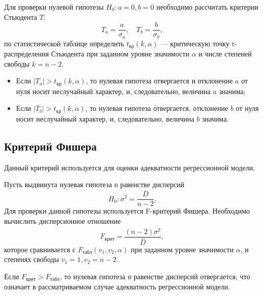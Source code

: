 Для проверки нулевой гипотезы $H_0: a=0, b=0$ необходимо рассчитать критерии Стьюдента $T$:
\begin{equation*}
	T_a = \frac{a}{\sigma_a}, \quad T_b = \frac{b}{\sigma_b},
\end{equation*}
по статистической таблице определить $t_{\textrm{кр}} \left( k, \alpha \right)$ --- критическую точку t-распределения Стьюдента при заданном уровне значимости $\alpha$ и числе степеней свободы $k = n - 2$.
\begin{itemize}
	\item Если $\left| T_a \right| > t_{\textrm{кр}} \left( k, \alpha \right)$, то нулевая гипотеза	отвергается и отклонение $a$ от нуля носит неслучайный характер, и, следовательно, величина $a$ значима;
	\item Если $\vert T_b \vert > t_{\textrm{кр}} \left( k, \alpha \right)$, то нулевая гипотеза отвергается, отклонение $b$ от нуля носит неслучайный характер, и, следовательно, величина $b$ значима.
\end{itemize}


\subsection*{Критерий Фишера} %
\label{subsec:fisher}

Данный критерий используется для оценки адекватности регрессионной модели.

Пусть выдвинута нулевая гипотеза о равенстве дисперсий 
\begin{equation*}
	H_0: \overline{\sigma^2} = \frac{\overline{D}}{n - 2}.
\end{equation*}
Для проверки данной гипотезы используется F-критерий Фишера. Необходимо вычислить дисперсионное отношение 
\begin{equation*}
	F_{\textrm{крит}} = \frac{(n-2)\overline{\sigma^2}}{\overline{D}},	
\end{equation*}
которое сравнивается с $F_{\textrm{табл}}(v_1, v_2, \alpha)$ при заданном уровне значимости $\alpha$, и степенях свободы $v_1=1, v_2=n - 2$. 

Если $F_{\textrm{крит}} > F_{\textrm{табл}}$, то нулевая гипотеза о равенстве дисперсий отвергается, что означает в рассматриваемом случае адекватность регрессионной модели.


